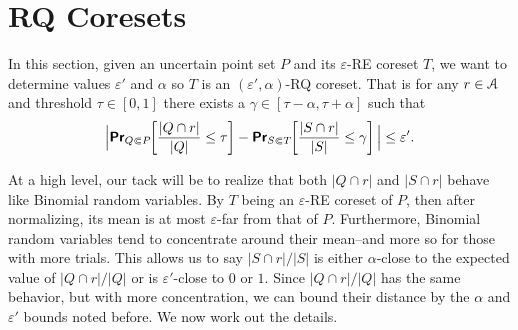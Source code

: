 \documentclass[11pt]{myclass}
\newcommand{\eps}{\varepsilon}
\newcommand{\Eu}[1]{\ensuremath{\EuScript{#1}}}
\renewcommand{\Pr}{\textbf{\textsf{Pr}}}
\newcommand{\RE}{\textsf{RE}\xspace}
\newcommand{\RQ}{\textsf{RQ}\xspace}
\begin{document}
\section{\RQ Coresets}



In this section, given an uncertain point set $P$ and its $\eps$-\RE coreset $T$, we want to determine values $\eps'$ and $\alpha$ so $T$ is an $(\eps',\alpha)$-\RQ coreset.  
That is for any $r \in \Eu{A}$ and threshold $\tau \in [0,1]$ there exists a $\gamma \in [\tau-\alpha, \tau+\alpha]$ such that 
\[
\Big| \Pr_{Q \Subset P} \hspace{-1mm} \left[\frac{|Q \cap r|}{|Q|} \leq \tau \right]  -
\Pr_{S \Subset T} \hspace{-1mm} \left[\frac{|S \cap r|}{|S|} \leq \gamma \right] \Big| \leq \eps'.
\]

At a high level, our tack will be to realize that both $|Q \cap r|$ and $|S \cap r|$ behave like Binomial random variables.  By $T$ being an $\eps$-\RE coreset of $P$, then after normalizing, its mean is at most $\eps$-far from that of $P$.  Furthermore, Binomial random variables tend to concentrate around their mean--and more so for those with more trials.  This allows us to say $|S \cap r|/|S|$ is either $\alpha$-close to the expected value of $|Q \cap r|/|Q|$ or is $\eps'$-close to $0$ or $1$.  Since $|Q \cap r|/|Q|$ has the same behavior, but with more concentration, we can bound their distance by the $\alpha$ and $\eps'$ bounds noted before.  We now work out the details.  
  
\end{document}
